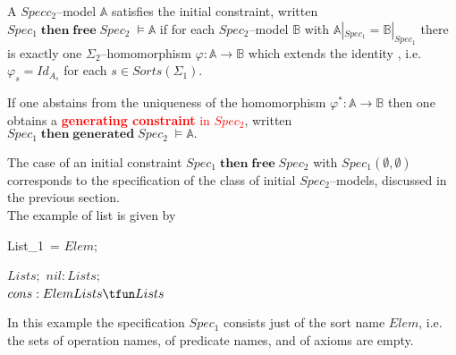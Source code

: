 \documentclass[landscape, autoslides, light]{mmiss}
\begin{document}
\begin{Package}[Label={FSDPT}, Title={Formal Specification of Data and Process Types}, ShortTitle={FSDPT}, Authors={Horst Reichel}, Date={February 2003}, LevelOfDetail=Lecture, Language=en-GB]
\begin{Section}[Title={Initial Algebras as Data Types}, Label={section3}]
\begin{Section}[Title={Generic Specifications}, Label={section3_4}]
\begin{Paragraph}[Label=Paragraph59]
\begin{Definition}[Title = {Initial Algebras as Data Types}, Label = {Definition2}]
\pause A $Specc_2$--model $\mathbb{A}$ satisfies the initial
constraint, written $ Spec_1 \; \mathbf{then \; free} \; Spec_2 \;
\models \mathbb{A} $ if for each $Spec_2$--model $ \mathbb{B}$
with $ \mathbb{A}|_{Spec_1} = \mathbb{B}|_{Spec_1}$ there is
exactly one $\Sigma_2$--homomorphism $\varphi  : \mathbb{A} \to
\mathbb{B}$ which extends the identity , i.e. $\varphi_s =
Id_{A_s}$ for each $s \in Sorts(\Sigma_1)$.

\pause If one abstains from the uniqueness of the homomorphism
$\varphi^* : \mathbb{A} \to \mathbb{B}$ then one obtains a
\textcolor{red}{\textbf{generating constraint} in $Spec_2$},
written $ Spec_1 \; \mathbf{then \; generated} \; Spec_2 \;
\models \mathbb{A}. $
\end{Definition}


\end{Paragraph}
\begin{Paragraph}[Label=Paragraph60]
The case of an initial constraint $Spec_1 \; \mathbf{then \; free}
\; Spec_2 $ with $Spec_1 ( \emptyset, \emptyset)$ corresponds to
the specification of the class of initial $Spec_2$--models,
discussed in the previous section.\\ \pause The example of list is
given by \pause  \footnotesize
\begin{SpecDefn}{List\_1}~= \I\Sort \( Elem;
\) \item[\Then] \item[\Free~\Group]
\begin{Items}
\I\Sort \( Lists; \) \I\Ops \( nil : Lists; \)
\\ \( cons : Elem \* Lists \tfun Lists \)
 ~\EndGroup \end{Items} \I \End
\end{SpecDefn} \small
In this example the specification $Spec_1$ consists just of the
sort name $Elem$, i.e. the sets of operation names, of predicate
names, and of axioms are empty.


\end{Paragraph}
\begin{Paragraph}[Label=Paragraph61]


\end{Paragraph}
\end{Section}
\end{Section}
\end{Package}
\end{document}
